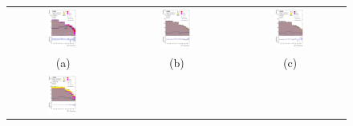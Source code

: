 \begin{figure}[H]
\centering
\begin{tabular}{@{}ccc@{}}
\includegraphics[width=0.29\textwidth]{figures/BDT/tcH_reg1l2tau1bnj_os.pdf}&
\includegraphics[width=0.29\textwidth]{figures/BDT/tcH_reg1l1tau1b1j_ss.pdf}&
\includegraphics[width=0.29\textwidth]{figures/BDT/tcH_reg1l1tau1b2j_ss.pdf}\\
(a)  & (b) & (c) \\
\includegraphics[width=0.29\textwidth]{figures/BDT/tcH_reg1l1tau1b2j_os.pdf}&

\end{tabular}
\end{figure}
